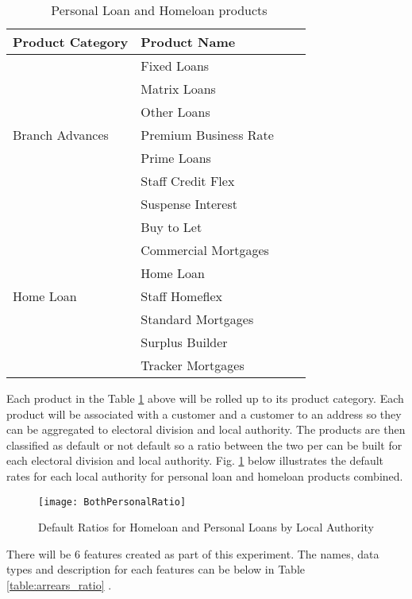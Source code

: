 \begin{table}[H]
	\centering
		\small
			\begin{tabular}{llll}
			\hline
			\textbf{Product Category} & \textbf{Product Name} \\ \hline
			     & Fixed Loans \\ 
			    & Matrix Loans \\ 
			     & Other Loans \\ 
			Branch Advances     & Premium Business Rate \\ 
			     & Prime Loans \\ 
			     & Staff Credit Flex \\ 
					& Suspense Interest \\ \hline
			           & Buy to Let \\ 
			           & Commercial Mortgages \\ 
			           & Home Loan \\ 
			Home Loan           & Staff Homeflex \\ 
			           & Standard Mortgages \\ 
			           & Surplus Builder \\ 	
			           & Tracker Mortgages \\ \hline		
		\end{tabular}
	\caption{\subjectname\ Personal Loan and Homeloan products}
	\label{table:AIB_Products}
\end{table}

Each product in the Table \ref{table:AIB_Products} above will be rolled up to its product category. Each product will be associated with a customer and a customer to an address so they can be aggregated to electoral division and local authority. The products are then classified as default or not default so a ratio between the two per can be built for each electoral division and local authority. Fig. \ref{fig:BothPersonalRatio} below illustrates the default rates for each local authority for personal loan and homeloan products combined. 

\begin{figure}[H]
	\texttt{[image: BothPersonalRatio]}
	\caption{Default Ratios for Homeloan and Personal Loans by Local Authority}
	\label{fig:BothPersonalRatio}
\end{figure}

There will be 6 features created as part of this experiment. The names, data types and description for each features can be below in Table \ref{table:arrears_ratio} .

